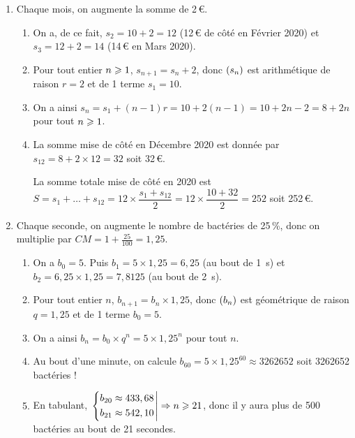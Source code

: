 \documentclass[a4paper,11pt]{article}
\begin{document}
\smallskip


\begin{enumerate}
	\item Chaque mois, on augmente la somme de 2\,€.
	\begin{enumerate}
		\item On a, de ce fait, $s_2=10+2=12$ (12\,€ de côté en Février 2020) et $s_3=12+2=14$ (14\,€ en Mars 2020).
		\item Pour tout entier $n \pg 1$, $s_{n+1}=s_n+2$, donc $\suiten[s]$ est arithmétique de raison $r=2$ et de 1 terme $s_1=10$.
		\item On a ainsi $s_n = s_1 + (n-1)r=10+2(n-1)=10+2n-2=8+2n$ pour tout $n \pg 1$.
		\item La somme mise de côté en Décembre 2020 est donnée par $s_{12}=8+2\times12=32$ soit 32\,€.
		
		La somme totale mise de côté en 2020 est $S=s_1+\ldots+s_{12}=12 \times \dfrac{s_1+s_{12}}{2}=12 \times \dfrac{10+32}{2}=252$ soit 252\,€.
	\end{enumerate}
	\item Chaque seconde, on augmente le nombre de bactéries de 25\,\%, donc on multiplie par $CM=1+\tfrac{25}{100}=1,25$.
	\begin{enumerate}
		\item On a $b_0=5$. Puis $b_1=5 \times 1,25 = 6,25$ (au bout de 1~s) et $b_2=6,25 \times 1,25 = 7,8125$ (au bout de 2~s).
		\item Pour tout entier $n$, $b_{n+1}=b_n \times 1,25$, donc $\suiten[b]$ est géométrique de raison $q=1,25$ et de 1 terme $b_0=5$.
		\item On a ainsi $b_n = b_0 \times q^{n} =  5 \times 1,25 ^n$ pour tout $n$.
		\item Au bout d'une minute, on calcule $b_{60}=5 \times 1,25^{60} \approx \num{3262652}$ soit \num{3262652} bactéries !
		\item En tabulant, $\left. \begin{dcases} b_{20} \approx 433,68 \\ b_{21} \approx 542,10 \end{dcases} \right| \Rightarrow n \pg 21$, donc il y aura plus de 500 bactéries au bout de 21 secondes.
	\end{enumerate}
\end{enumerate}

\smallskip

\end{document}
